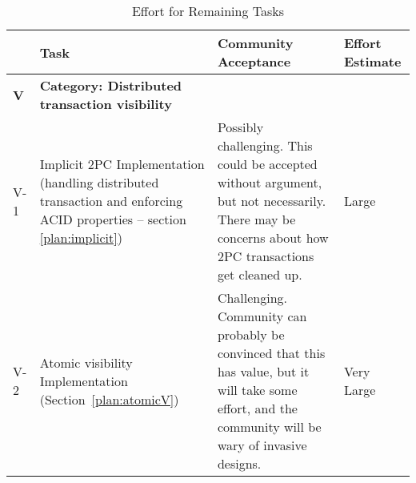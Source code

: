 	\begin{longtable}{lp{0.5\hsize}p{0.2\hsize}p{0.2\hsize}}
		\caption{\label{tab:remainingTask}Effort for Remaining Tasks} \\ \hline
		&Task & Community Acceptance & Effort Estimate \\ \hline
		\endfirsthead
		\textbf{V} & \textbf{Category: Distributed transaction visibility} & & \\ \hline
		V-1 & \raggedright
			  Implicit 2PC Implementation (handling distributed transaction and enforcing
			  ACID properties -- section \ref{plan:implicit})
			& \raggedright Possibly challenging. This could be accepted without argument,
			  but not necessarily.
			  There may be concerns about how 2PC transactions get cleaned up.
			& Large \\ \hline
		V-2 & \raggedright Atomic visibility Implementation (Section~\ref{plan:atomicV})
			& Challenging.  Community can probably be convinced that this has value,
			  but it will take some effort, and the community will be wary of invasive designs.
			& Very Large \\ \hline
	\end{longtable}
